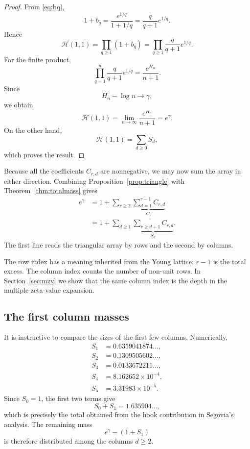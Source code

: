 \documentclass[11pt]{article}
\theoremstyle{definition}
\begin{document}
\begin{proof}
From \eqref{eq:bq},
\[
        1+b_q
        =
        \frac{e^{1/q}}{1+1/q}
        =
        \frac{q}{q+1}e^{1/q}.
\]
Hence
\[
 \mathscr H(1,1)
 =
 \prod_{q\geq1}(1+b_q)
 =
 \prod_{q\geq1}
 \frac{q}{q+1}e^{1/q}.
\]
For the finite product,
\[
 \prod_{q=1}^n
 \frac{q}{q+1}e^{1/q}
 =
 \frac{e^{H_n}}{n+1}.
\]
Since
\[
        H_n-\log n\longrightarrow\gamma,
\]
we obtain
\[
        \mathscr H(1,1)
        =
        \lim_{n\to\infty}
        \frac{e^{H_n}}{n+1}
        =
        e^\gamma.
\]
On the other hand,
\[
        \mathscr H(1,1)
        =
        \sum_{d\geq0}S_d,
\]
which proves the result.
\end{proof}

Because all the coefficients $C_{r,d}$ are nonnegative, we may now
sum the array in either direction.  Combining
Proposition~\ref{prop:triangle} with
Theorem~\ref{thm:totalmass} gives
\begin{equation}\label{eq:two-sums}
 \boxed{
 \begin{aligned}
 e^\gamma
 &=
 1+\sum_{r\geq2}
       \underbrace{\sum_{d=1}^{r-1}C_{r,d}}_{C_r}\\
 &=
 1+\sum_{d\geq1}
       \underbrace{\sum_{r\geq d+1}C_{r,d}}_{S_d}.
 \end{aligned}}
\end{equation}
The first line reads the triangular array by rows and the second by
columns.

The row index has a meaning inherited from the Young lattice:
$r-1$ is the total excess.  The column index counts the number of
non-unit rows.  In Section~\ref{sec:mzv} we show that the same column index is
the depth in the multiple-zeta-value expansion.

\subsection{The first column masses}

It is instructive to compare the sizes of the first few columns.
Numerically,
\[
\begin{aligned}
 S_1&=0.6359041874\ldots,\\
 S_2&=0.1309505602\ldots,\\
 S_3&=0.0133672211\ldots,\\
 S_4&=8.162652\times10^{-4},\\
 S_5&=3.31983\times10^{-5}.
\end{aligned}
\]
Since $S_0=1$, the first two terms give
\[
        S_0+S_1
        =
        1.635904\ldots,
\]
which is precisely the total obtained from the hook contribution in
Segovia's analysis.  The remaining mass
\[
        e^\gamma-(1+S_1)
\]
is therefore distributed among the columns $d\geq2$.
\end{document}
